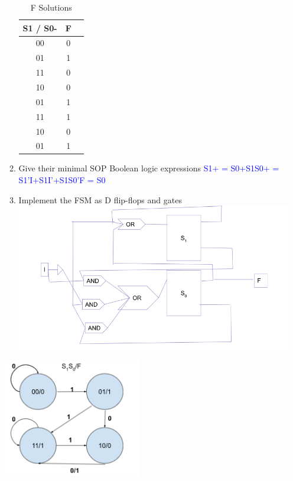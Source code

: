 \documentclass{article}
\begin{document}
\begin{enumerate}[label=(\alph*)]
\begin{enumerate}[label=(\roman*),nolistsep]
\begin{table}[h]
\centering
\begin{tabular}{|c|c|c|}
\hline
S1 / S0- & F \\
\hline
00 & 0 \\
01 & 1 \\
11 & 0 \\
10 & 0 \\
01 & 1 \\
11 & 1 \\
10 & 0 \\
01 & 1 \\
\hline
\end{tabular}
\caption{F Solutions }
\end{table}
            \item Give their minimal SOP Boolean logic expressions \newline\textcolor{blue}{S1+ = S0+S1\newline S0+ = S1’I+S1I’+S1S0’\newline F = S0}
            \item Implement the FSM as D flip-flops and gates
            \newline 
            \includegraphics{figures/ScuffedDiagram.PNG}
        \end{enumerate}
        \begin{multicols}{2}
        \begin{center}
        \includegraphics[width=6cm]{figures/FSMDesign.png}

\end{center}
\end{multicols}
\end{enumerate}
\end{document}
